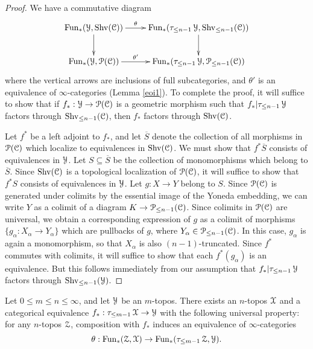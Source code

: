\begin{proof}
We have a commutative diagram
$$ \xymatrix{ \Fun_{\ast}( \calY, \Shv(\calC) ) \ar[r]^-{\theta} \ar[d] & \Fun_{\ast}( \tau_{\leq n-1} \calY, \Shv_{\leq n-1}(\calC) ) \ar[d] \\
\Fun_{\ast}(\calY, \calP(\calC) ) \ar[r]^-{\theta'} & \Fun_{\ast}( \tau_{\leq n-1} \calY, \calP_{\leq n-1}(\calC))}$$
where the vertical arrows are inclusions of full subcategories, and $\theta'$ is an equivalence of $\infty$-categories (Lemma \ref{eoi1}). To complete the proof, it will suffice to show that if
$f_{\ast}: \operatorname{\mathcal{Y}} \rightarrow \operatorname{\mathcal{P}}(\operatorname{\mathcal{C}})$ is a geometric morphism such that $f_{\ast} | \tau_{\leq n-1} \operatorname{\mathcal{Y}}$ factors through $\operatorname{Shv}_{\leq n-1}(\operatorname{\mathcal{C}})$, then $f_{\ast}$ factors through $\operatorname{Shv}(\operatorname{\mathcal{C}})$. 

Let $f^{\ast}$ be a left adjoint to $f_{\ast}$, and let $\overline{S}$ denote the collection of all
morphisms in $\operatorname{\mathcal{P}}(\operatorname{\mathcal{C}})$ which localize to equivalences in $\operatorname{Shv}(\operatorname{\mathcal{C}})$. We must show that $f^{\ast}\overline{S} $ consists of equivalences in $\operatorname{\mathcal{Y}}$. Let $S \subseteq \overline{S}$ be the collection of monomorphisms which belong to $\overline{S}$. Since $\operatorname{Shv}(\operatorname{\mathcal{C}})$ is a topological localization of $\operatorname{\mathcal{P}}(\operatorname{\mathcal{C}})$, it will suffice to show that $f^{\ast} S$ consists of equivalences in $\operatorname{\mathcal{Y}}$. Let $g: X \rightarrow Y$ belong to $S$. Since $\operatorname{\mathcal{P}}(\operatorname{\mathcal{C}})$ is generated under colimits by the essential image of the Yoneda embedding, we can write $Y$ as a colimit of a diagram
$K \rightarrow \operatorname{\mathcal{P}}_{\leq n-1}(\operatorname{\mathcal{C}})$. Since colimits in $\operatorname{\mathcal{P}}(\operatorname{\mathcal{C}})$ are universal, we obtain a corresponding expression of $g$ as a colimit of morphisms $\{ g_{\alpha}: X_{\alpha} \rightarrow Y_{\alpha} \}$ which are pullbacks of $g$, where $Y_{\alpha} \in \operatorname{\mathcal{P}}_{\leq n-1}(\operatorname{\mathcal{C}})$. In this case, $g_{\alpha}$ is again a monomorphism, so that $X_{\alpha}$ is also $(n-1)$-truncated.
Since $f^{\ast}$ commutes with colimits, it will suffice to show that each $f^{\ast}(g_{\alpha})$ is
an equivalence. But this follows immediately from our assumption that $f_{\ast} | \tau_{\leq n-1} \operatorname{\mathcal{Y}}$ factors through $\operatorname{Shv}_{\leq n-1}(\operatorname{\mathcal{Y}})$.
\end{proof}

\begin{proposition}\label{swmad}
Let $0 \leq m \leq n \leq \infty$, and let $\operatorname{\mathcal{Y}}$ be an $m$-topos. There exists an $n$-topos
$\operatorname{\mathcal{X}}$ and a categorical equivalence 
$f_{\ast}: \tau_{\leq m-1} \operatorname{\mathcal{X}} \rightarrow \operatorname{\mathcal{Y}}$ with the following universal property: for any $n$-topos $\operatorname{\mathcal{Z}}$, composition with $f_{\ast}$ induces
an equivalence of $\infty$-categories
$$ \theta: \operatorname{Fun}_{\ast}( \operatorname{\mathcal{Z}}, \operatorname{\mathcal{X}} ) \rightarrow \operatorname{Fun}_{\ast}( \tau_{\leq m-1} \operatorname{\mathcal{Z}}, \operatorname{\mathcal{Y}}).$$
\end{proposition}

